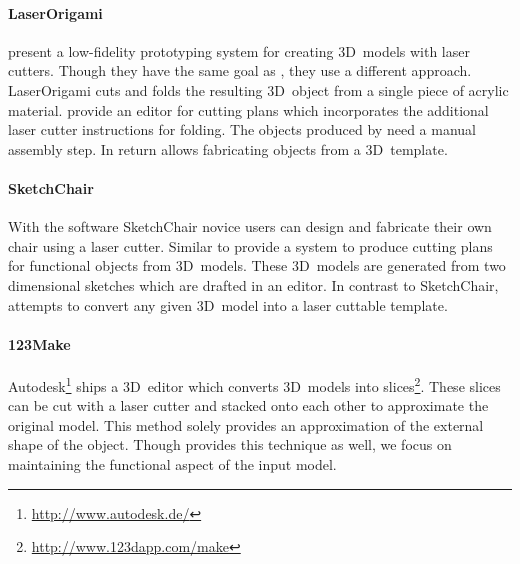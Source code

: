 \documentclass[../ClassicThesis.tex]{subfiles}
\begin{document}
\paragraph{LaserOrigami} \citet{laserorigami} present a
low-fidelity prototyping system for creating 3D~models with laser
cutters. Though they have the same goal as {\platener}, they use a
different approach. LaserOrigami cuts and folds the resulting
3D~object from a single piece of acrylic material.
\citeauthor{laserorigami} provide an editor for cutting plans which
incorporates the additional laser cutter instructions for folding. The
objects produced by {\platener} need a manual assembly step. In return
{\platener} allows fabricating objects from a 3D~template.

\paragraph{SketchChair} With the software SketchChair novice users can
design and fabricate their own chair using a laser cutter. Similar to
{\platener} \citet{sketchchair} provide a system to produce
cutting plans for functional objects from 3D~models. These 3D~models
are generated from two dimensional sketches which are drafted in an
editor. In contrast to SketchChair, {\platener} attempts to convert
any given 3D~model into a laser cuttable template.

\paragraph{123Make} Autodesk\footnote{\url{http://www.autodesk.de/}}
ships a 3D~editor which converts 3D~models into slices\footnote{\url{http://www.123dapp.com/make}}. These slices
can be cut with a laser cutter and stacked onto each other to
approximate the original model. This method solely provides an
approximation of the external shape of the object. Though {\platener}
provides this technique as well, we focus on maintaining the
functional aspect of the input model.
\end{document}

